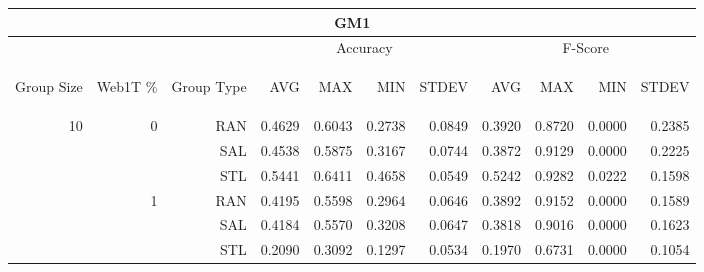 \begin{center}
\begin{table}[htbp]
\begin{tabular}{ | r | r | r | r | r | r | r | r | r | r | r |}
\hline
\multicolumn{11}{|c|}{GM1}\\
\hline
 & & & \multicolumn{4}{|c|}{Accuracy} & \multicolumn{4}{|c|}{F-Score}\\ \cline{4-11}
\begin{sideways}Group Size\end{sideways} & \begin{sideways}Web1T \%\end{sideways} & \begin{sideways}Group Type\end{sideways} & \begin{sideways}AVG\end{sideways} & \begin{sideways}MAX\end{sideways} & \begin{sideways}MIN\end{sideways} & \begin{sideways}STDEV\end{sideways} & \begin{sideways}AVG\end{sideways} & \begin{sideways}MAX\end{sideways} & \begin{sideways}MIN\end{sideways} & \begin{sideways}STDEV\end{sideways}\\
\hline
\multirow{18}{*}{10}
 & \multirow{3}{*}{0} & RAN & 0.4629 & 0.6043 & 0.2738 & 0.0849 & 0.3920 & 0.8720 & 0.0000 & 0.2385\\ \cline{3-11}
 &   & SAL & 0.4538 & 0.5875 & 0.3167 & 0.0744 & 0.3872 & 0.9129 & 0.0000 & 0.2225\\ \cline{3-11}
 &   & STL & 0.5441 & 0.6411 & 0.4658 & 0.0549 & 0.5242 & 0.9282 & 0.0222 & 0.1598\\ \cline{2-11}
 & \multirow{3}{*}{1} & RAN & 0.4195 & 0.5598 & 0.2964 & 0.0646 & 0.3892 & 0.9152 & 0.0000 & 0.1589\\ \cline{3-11}
 &   & SAL & 0.4184 & 0.5570 & 0.3208 & 0.0647 & 0.3818 & 0.9016 & 0.0000 & 0.1623\\ \cline{3-11}
 &   & STL & 0.2090 & 0.3092 & 0.1297 & 0.0534 & 0.1970 & 0.6731 & 0.0000 & 0.1054\\ \cline{2-11}

\end{tabular}
\end{table}
\end{center}
